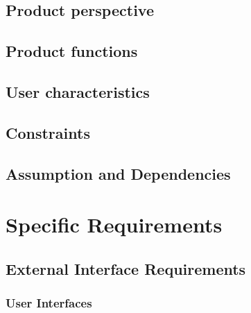 \documentclass{article}
\begin{document}
\subsection{Product perspective}
\subsubsection{}

\subsection{Product functions}
\subsubsection{}

\subsection{User characteristics}
\subsubsection{}

\subsection{Constraints}
\subsubsection{}

\subsection{Assumption and Dependencies}
\subsubsection{}

\section{Specific Requirements}

\subsection{External Interface Requirements}
\subsubsection{User Interfaces}
\end{document}
